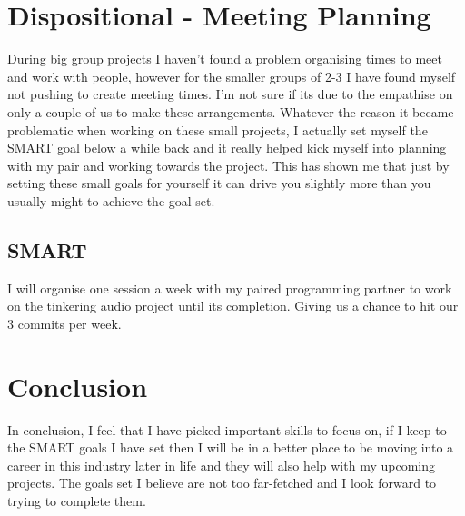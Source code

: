 \documentclass{scrartcl}
\begin{document}
\section{Dispositional - Meeting Planning}
During big group projects I haven't found a problem organising times to meet and work with people, however for the smaller groups of 2-3 I have found myself not pushing to create meeting times. I'm not sure if its due to the empathise on only a couple of us to make these arrangements. Whatever the reason it became problematic when working on these small projects, I actually set myself the SMART goal below a while back and it really helped kick myself into planning with my pair and working towards the project. This has shown me that just by setting these small goals for yourself it can drive you slightly more than you usually might to achieve the goal set.
\subsection{SMART}
I will organise one session a week with my paired programming partner to work on the tinkering audio project until its completion. Giving us a chance to hit our 3 commits per week.

\section{Conclusion}
In conclusion, I feel that I have picked important skills to focus on, if I keep to the SMART goals I have set then I will be in a better place to be moving into a career in this industry later in life and they will also help with my upcoming projects. The goals set I believe are not too far-fetched and I look forward to trying to complete them.
\end{document}
